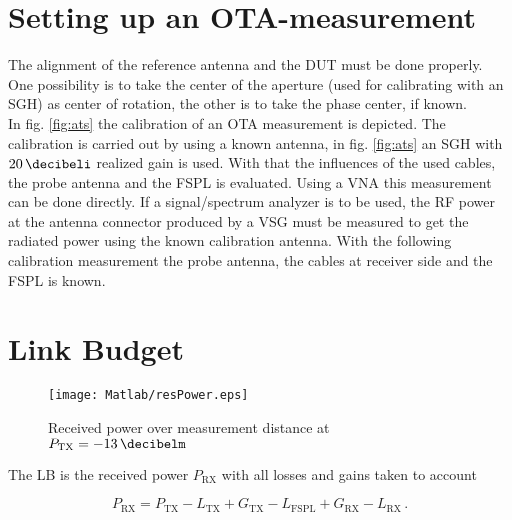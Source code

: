 \section{Setting up an OTA-measurement}
\label{sec:setupota}

The alignment of the reference antenna and the \ac{DUT} must be done properly. One possibility is to take the center of the aperture (used for calibrating with an \ac{SGH}) as center of rotation, the other is to take the phase center, if known.\\
In fig. \ref{fig:ats} the calibration of an \ac{OTA} measurement is depicted. The calibration is carried out by using a known antenna, in fig. \ref{fig:ats} an \ac{SGH} with $\SI{20}{\decibeli}$ realized gain is used. With that the influences of the used cables, the probe antenna and the \ac{FSPL} is evaluated. Using a \ac{VNA} this measurement can be done directly. If a signal/spectrum analyzer is to be used, the \ac{RF} power at the antenna connector produced by a \ac{VSG} must be measured to get the radiated power using the known calibration antenna. With the following calibration measurement the probe antenna, the cables at receiver side and the \ac{FSPL} is known. \cite{ctiaat}

\section{Link Budget}

\begin{figure}[H]
\centering
\texttt{[image: Matlab/resPower.eps]}
\caption{Received power over measurement distance at $P_{\text{TX}}=\SI{-13}{\decibelm}$}
\label{fig:resP}
\end{figure}

The \ac{LB} is the received power $P_{\text{RX}}$ with all losses and gains taken to account

\begin{equation}
P_{\text{RX}} = P_{\text{TX}}-L_{\text{TX}}+G_{\text{TX}}-L_{\text{FSPL}} + G_{\text{RX}}-L_{\text{RX}}\,.
\end{equation}

